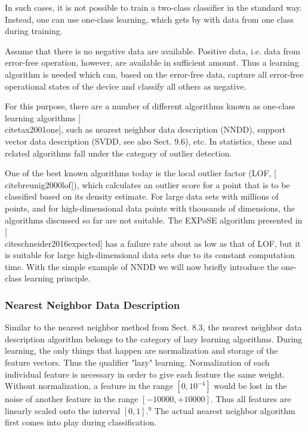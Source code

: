 \documentclass[10pt]{book}
\begin{document}
In such cases, it is not possible to train a two-class classifier in the standard way. Instead, one can use one-class learning, which gets by with data from one class during training.

Assume that there is no negative data are available. Positive data, i.e. data from error-free operation, however, are available in sufficient amount. Thus a learning algorithm is needed which can, based on the error-free data, capture all error-free operational states of the device and classify all others as negative.

For this purpose, there are a number of different algorithms known as one-class learning algorithms [\\cite{tax2001one}], such as nearest neighbor data description (NNDD), support vector data description (SVDD, see also Sect. 9.6), etc. In statistics, these and related algorithms fall under the category of outlier detection.

One of the best known algorithms today is the local outlier factor (LOF, [\\cite{breunig2000lof}]), which calculates an outlier score for a point that is to be classified based on its density estimate. For large data sets with millions of points, and for high-dimensional data points with thousands of dimensions, the algorithms discussed so far are not suitable. The EXPoSE algorithm presented in [\\cite{schneider2016expected}] has a failure rate about as low as that of LOF, but it is suitable for large high-dimensional data sets due to its constant computation time. With the simple example of NNDD we will now briefly introduce the one-class learning principle.

\subsubsection*{Nearest Neighbor Data Description}
Similar to the nearest neighbor method from Sect. 8.3, the nearest neighbor data description algorithm belongs to the category of lazy learning algorithms. During learning, the only things that happen are normalization and storage of the feature vectors. Thus the qualifier "lazy" learning. Normalization of each individual feature is necessary in order to give each feature the same weight. Without normalization, a feature in the range $\left[0,10^{-4}\right]$ would be lost in the noise of another feature in the range $[-10000,+10000]$. Thus all features are linearly scaled onto the interval $[0,1] .{ }^{9}$ The actual nearest neighbor algorithm first comes into play during classification.
\end{document}
